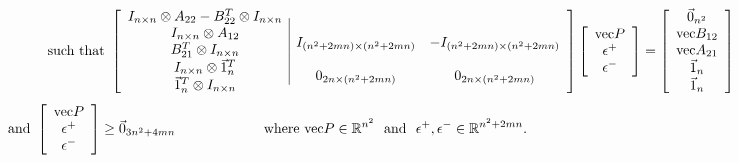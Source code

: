 \documentclass[12pt]{article}
\newcommand{\R}{\mathbb{R}}
\begin{document}
\[ \mbox{such that }
\left [ \begin{array}{c} I_{n \times n} \otimes A_{22}
 -B^T_{22} \otimes I_{n \times n}
  \\ I_{n \times n} \otimes  A_{12}
  \\ B^T_{21} \otimes I_{n \times n} 
  \\ I_{n \times n}  \otimes \vec{1}^T_{n}
  \\ \vec{1}^T_{n} \otimes I_{n \times n}
   \end{array}
 \begin{array}{|cc}  & \\  I_{(n^2 + 2mn)\times (n^2+2mn)} &
 -I_{(n^2+2mn) \times (n^2+2mn)} \\ &  \\ 0_{2n \times (n^2+2mn)} & 0_{2n\times (n^2+2mn)}
 \end{array}
   \right ]
\left [ \begin{array}{c} \textup{vec}P \\ \epsilon^+ \\ \epsilon^- \end{array}
\right ]
=
\left [ \begin{array}{c}  \vec{0}_{n^2} \\ \textup{vec}B_{12} \\
\textup{vec}A_{21}\\ \vec{1}_n \\ \vec{1}_n  \end{array} \right ]
\]
\[ \mbox{and } \left [ \begin{array}{c} \textup{vec}P \\ \epsilon^+ \\ \epsilon^- \end{array}
\right ] \geq \vec{0}_{3n^2+4mn} \ \ \ \ \ \ \ \
\ \ \ \ \ \ \ \ \ \ \
\mbox{where } \mbox{vec}P \in \R^{n^2}
\ \ \mbox{and} \ \
\epsilon^+,\epsilon^- \in \R^{n^2+2mn} .
 \ \ \ \ \
\ \ \ \ \ \ \ \ \ \ \ \ \ \ \ \ \ \ \ \ \ \ \ \ \ \ \ \ \ \
\ \ \ \ \ \ \ \ \ \ \ \ \ \ \ \ \ \
\]
\end{document}
